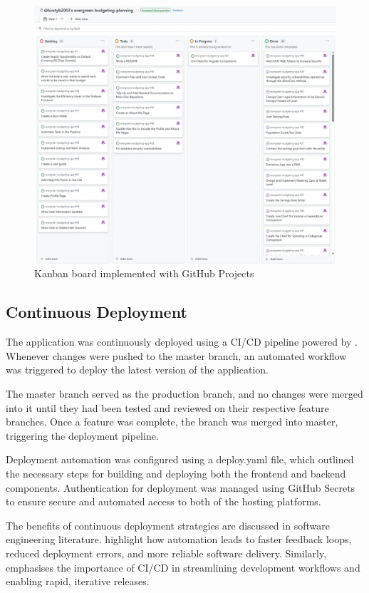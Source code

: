 \documentclass{l4proj}
\begin{document}
\begin{figure}[h]
    \centering
    \includegraphics[width=0.75\linewidth]{images/GitHub-Screenshots/kanban-board.png}
    \caption{Kanban board implemented with GitHub Projects}
    \label{fig:kanban}
\end{figure}

\subsection{Continuous Deployment}

The application was continuously deployed using a CI/CD pipeline powered by \citet{github_actions_deploying}. Whenever changes were pushed to the master branch, an automated workflow was triggered to deploy the latest version of the application.

The master branch served as the production branch, and no changes were merged into it until they had been tested and reviewed on their respective feature branches. Once a feature was complete, the branch was merged into master, triggering the deployment pipeline.

Deployment automation was configured using a deploy.yaml file, which outlined the necessary steps for building and deploying both the frontend and backend components. Authentication for deployment was managed using GitHub Secrets to ensure secure and automated access to both of the hosting platforms.

The benefits of continuous deployment strategies are discussed in software engineering literature. \citet{humble_continuous_2010} highlight how automation leads to faster feedback loops, reduced deployment errors, and more reliable software delivery. Similarly, \citet{fowler_continuous_integration} emphasises the importance of CI/CD in streamlining development workflows and enabling rapid, iterative releases.
\end{document}

